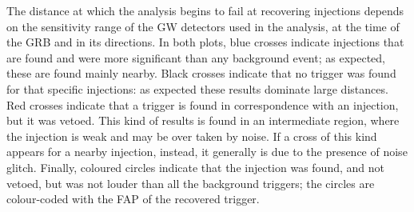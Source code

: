 \documentclass[binding=0.6cm, LaM]{sapthesis}
\begin{document}
	The distance at which the analysis begins to fail at recovering injections 
	depends on the sensitivity range of the GW detectors used in the analysis, 
	at the time of the GRB and in its directions.
	In both plots, blue crosses indicate injections that are found 
	and were more significant than any background event;
	as expected, these are found mainly nearby.
	Black crosses indicate that no trigger was found for that specific injections: 
	as expected these results dominate large distances.
	Red crosses indicate that a trigger is found in correspondence with an injection, 			
	but it was vetoed.
	This kind of results is found in an intermediate region, 
	where the injection is weak and may be over taken by noise.
	If a cross of this kind appears for a nearby injection, instead, 
	it generally is due to the presence of noise glitch. 
	Finally, coloured circles indicate that the injection was found, and not vetoed, 
	but was not louder than all the background triggers;
	the circles are colour-coded with the FAP of the recovered trigger.
	
\end{document}
